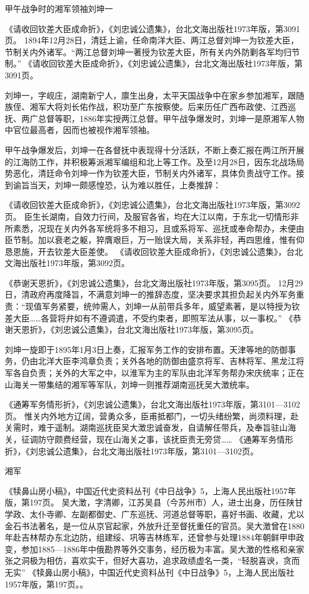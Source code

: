 \documentclass[12pt,UTF8]{ctexbook}
\begin{document}
甲午战争时的湘军领袖刘坤一

《请收回钦差大臣成命折》，《刘忠诚公遗集》，台北文海出版社1973年版，第3091页。
1894年12月28日，清廷上谕，任命南洋大臣、两江总督刘坤一为钦差大臣，节制关内外诸军。“两江总督刘坤一著授为钦差大臣，所有关内外防剿各军均归节制。” 《请收回钦差大臣成命折》，《刘忠诚公遗集》，台北文海出版社1973年版，第3091页。

刘坤一，字岘庄，湖南新宁人，廪生出身，太平天国战争中在家乡参加湘军，跟随族侄、湘军大将刘长佑作战，积功至广东按察使。后来历任广西布政使、江西巡抚、两广总督等职，1886年实授两江总督。甲午战争爆发时，刘坤一是原湘军人物中官位最高者，因而也被视作湘军领袖。

甲午战争爆发后，刘坤一在各督抚中表现得十分活跃，不断上奏汇报在两江所开展的江海防工作，并积极筹派湘军编组和北上等工作。及至12月28日，因东北战场局势恶化，清廷命令刘坤一作为钦差大臣，节制关内外诸军，具体负责战守工作。接到谕旨当天，刘坤一颇感惶恐，认为难以胜任，上奏推辞：

《请收回钦差大臣成命折》，《刘忠诚公遗集》，台北文海出版社1973年版，第3092页。
臣生长湖南，自效力行间，及服官各省，均在大江以南，于东北一切情形非所素悉，况现在关内外各军统将多不相习，且或系将军、巡抚或奉命帮办，未便由臣节制。加以衰老之躯，猝膺艰巨，万一贻误大局，关系非轻，再四思维，惟有仰恳恩施，开去钦差大臣差使。 《请收回钦差大臣成命折》，《刘忠诚公遗集》，台北文海出版社1973年版，第3092页。

《恭谢天恩折》，《刘忠诚公遗集》，台北文海出版社1973年版，第3095页。
12月29日，清政府再度降旨，不满意刘坤一的推辞态度，坚决要求其担负起关内外军务重责：“现值军务紧要，统帅需人，刘坤一从前带兵多年，威望素著，是以特授为钦差大臣……各营将弁如有不遵调遣，不受约束者，即照军法从事，以一事权。” 《恭谢天恩折》，《刘忠诚公遗集》，台北文海出版社1973年版，第3095页。

刘坤一旋即于1895年1月3日上奏，汇报军务工作的安排布置。天津等地的防御事务，仍由北洋大臣李鸿章负责；关外各地的防御由盛京将军、吉林将军、黑龙江将军各自负责；关外的大军之中，以淮军为主的军队由北洋军务帮办宋庆统率；正在山海关一带集结的湘军等军队，刘坤一则推荐湖南巡抚吴大澂统率。

《通筹军务情形折》，《刘忠诚公遗集》，台北文海出版社1973年版，第3101—3102页。
惟关内外地方辽阔，营勇众多，臣甫抵都门，一切头绪纷繁，尚须料理，赴关需时，难于遥制。湖南巡抚臣吴大澂忠诚奋发，自请解任带兵，及奉旨驻山海关，征调防守颇费经营，现在山海关之事，该抚臣责无旁贷…… 《通筹军务情形折》，《刘忠诚公遗集》，台北文海出版社1973年版，第3101—3102页。

湘军

《犊鼻山房小稿》，中国近代史资料丛刊《中日战争》5，上海人民出版社1957年版，第197页。
吴大澂，字清卿，江苏吴县（今苏州市）人，进士出身，历任陕甘学政、太仆寺卿、左副都御史、广东巡抚、河道总督等职，喜好书画、收藏，尤以金石书法著名，是一位从京官起家，外放升迁至督抚重任的官员。吴大澂曾在1880年赴吉林帮办东北边防，组建绥、巩等吉林练军，还曾参与处理1884年朝鲜甲申政变，参加1885—1886年中俄勘界等外交事务，经历极为丰富。吴大澂的性格和亲家张之洞极为相仿，喜欢实干，但好大喜功，追求政绩虚名一类，“轻脱喜谀，贪而无实” 《犊鼻山房小稿》，中国近代史资料丛刊《中日战争》5，上海人民出版社1957年版，第197页。。
\end{document}
